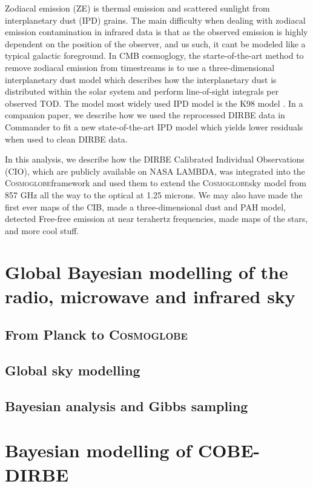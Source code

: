 \documentclass{aa}
\def\Cosmoglobe{\textsc{Cosmoglobe}}
\begin{document}
Zodiacal emission (ZE) is thermal emission and scattered sunlight from interplanetary dust (IPD) grains. The main difficulty when dealing with zodiacal emission contamination in infrared data is that as the observed emission is highly dependent on the position of the observer, and us such, it cant be modeled like a typical galactic foreground. In CMB cosmoglogy, the starte-of-the-art method to remove zodiacal emission from timestreams is to use a three-dimensional interplanetary dust model which describes how the interplanetary dust is distributed within the solar system and perform line-of-sight integrals per observed TOD. The model most widely used IPD model is the K98 model \citep{K98}. In a companion paper, we describe how we used the reprocessed DIRBE data in Commander to fit a new state-of-the-art IPD model which yields lower residuals when used to clean DIRBE data.

In this analysis, we describe how the DIRBE Calibrated Individual Observations (CIO), which are publicly available on NASA LAMBDA, was integrated into the \Cosmoglobe framework and used them to extend the \Cosmoglobe sky model from 857 GHz all the way to the optical at 1.25 microns. We may also have made the first ever maps of the CIB, made a three-dimensional dust and PAH model, detected Free-free emission at near terahertz frequencies, made maps of the stars, and more cool stuff.

\clearpage
\section{Global Bayesian modelling of the radio, microwave and infrared sky}

\subsection{From Planck to \Cosmoglobe}

\subsection{Global sky modelling}

\subsection{Bayesian analysis and Gibbs sampling}

\clearpage
\section{Bayesian modelling of COBE-DIRBE}
\end{document}
